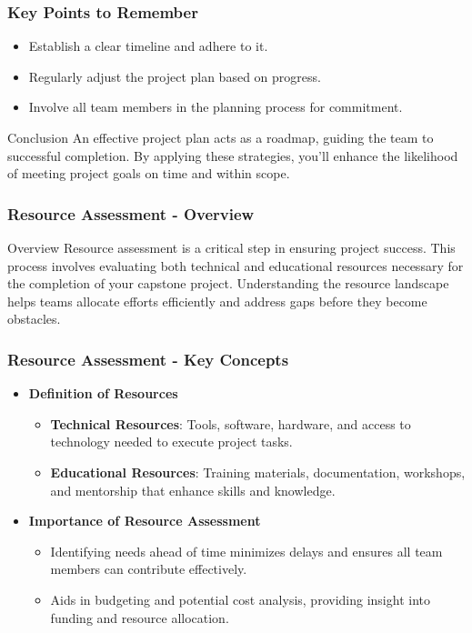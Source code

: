 \documentclass[aspectratio=169]{beamer}
\begin{document}
\begin{frame}[fragile]
  \frametitle{Key Points to Remember}
  \begin{itemize}
    \item Establish a clear timeline and adhere to it.
    \item Regularly adjust the project plan based on progress.
    \item Involve all team members in the planning process for commitment.
  \end{itemize}

  \begin{block}{Conclusion}
    An effective project plan acts as a roadmap, guiding the team to successful completion. 
    By applying these strategies, you'll enhance the likelihood of meeting project goals on time and within scope.
  \end{block}
\end{frame}

\begin{frame}[fragile]
    \frametitle{Resource Assessment - Overview}
    \begin{block}{Overview}
        Resource assessment is a critical step in ensuring project success. This process involves evaluating both technical and educational resources necessary for the completion of your capstone project. Understanding the resource landscape helps teams allocate efforts efficiently and address gaps before they become obstacles.
    \end{block}
\end{frame}

\begin{frame}[fragile]
    \frametitle{Resource Assessment - Key Concepts}
    \begin{itemize}
        \item \textbf{Definition of Resources}
        \begin{itemize}
            \item \textbf{Technical Resources}: Tools, software, hardware, and access to technology needed to execute project tasks.
            \item \textbf{Educational Resources}: Training materials, documentation, workshops, and mentorship that enhance skills and knowledge.
        \end{itemize}
    
        \item \textbf{Importance of Resource Assessment}
        \begin{itemize}
            \item Identifying needs ahead of time minimizes delays and ensures all team members can contribute effectively.
            \item Aids in budgeting and potential cost analysis, providing insight into funding and resource allocation.
        \end{itemize}
    \end{itemize}
\end{frame}
\end{document}
